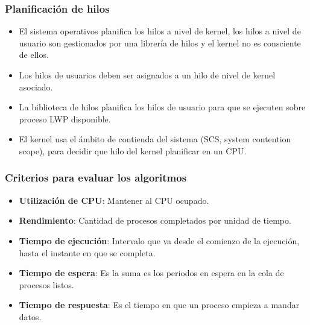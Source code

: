 \documentclass{beamer}
\begin{document}
\begin{frame}
	\frametitle{Planificación de hilos}
	
	\begin{itemize}
		\item El sistema operativos planifica los hilos a nivel de kernel, los
		hilos a nivel de usuario son gestionados por una librería de hilos y el kernel no es consciente
		de ellos.
		\item Los hilos de usuarios deben ser asignados a un hilo de nivel
		de kernel asociado.
		\item La biblioteca de hilos planifica los hilos de usuario para que se ejecuten sobre proceso LWP disponible.
		\item El kernel usa el ámbito de contienda del sistema (SCS, system contention scope), para decidir que hilo del kernel planificar en un CPU.
	\end{itemize}
\end{frame}


\begin{frame}
\frametitle{Criterios para evaluar los algoritmos}

\begin{itemize}
\item \textbf{Utilización de CPU}: Mantener al CPU ocupado.

\item \textbf{Rendimiento}: Cantidad de procesos completados por unidad de tiempo.

\item \textbf{Tiempo de ejecución}: Intervalo que va desde el comienzo de la ejecución, hasta el instante en que se completa.

\item \textbf{Tiempo de espera}: Es la suma es los periodos en espera en la cola de procesos listos.

\item \textbf{Tiempo de respuesta}: Es el tiempo en que un proceso empieza a mandar datos.
\end{itemize}
\end{frame}
\end{document}
